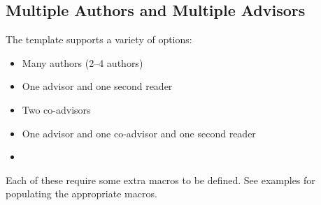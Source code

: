 \subsection{Multiple Authors and Multiple Advisors}
The template supports a variety of options:
\begin{itemize}
\item Many authors (2--4 authors)
\item One advisor and one second reader
\item Two co-advisors
\item One advisor and one co-advisor and one second reader
\item \etc
\end{itemize}
Each of these require some extra macros to be defined.
See examples for populating the appropriate macros.
